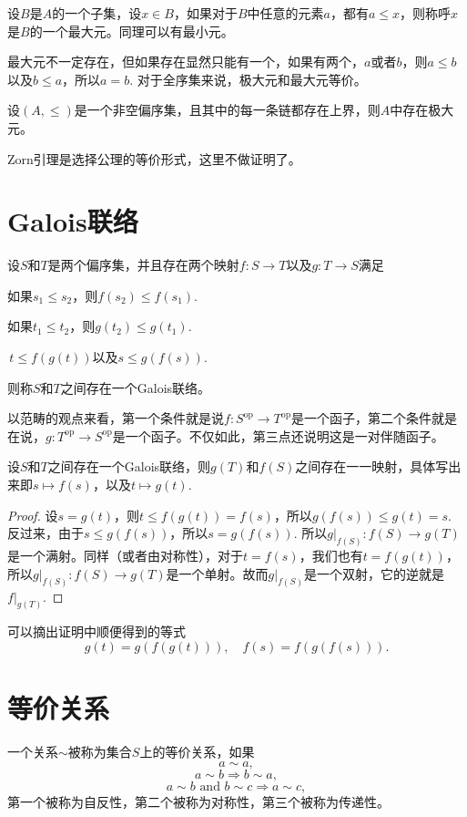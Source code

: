 \para 设$B$是$A$的一个子集，设$x\in B$，如果对于$B$中任意的元素$a$，都有$a\leq x$，则称呼$x$是$B$的一个最大元。同理可以有最小元。

最大元不一定存在，但如果存在显然只能有一个，如果有两个，$a$或者$b$，则$a\leq b$以及$b\leq a$，所以$a=b$. 对于全序集来说，极大元和最大元等价。

\begin{thm}[Zorn引理]
设$(A,\leq)$是一个非空偏序集，且其中的每一条链都存在上界，则$A$中存在极大元。
\end{thm}

Zorn引理是选择公理的等价形式，这里不做证明了。

\section{Galois联络}

\begin{para}
设$S$和$T$是两个偏序集，并且存在两个映射$f:S\to T$以及$g:T\to S$满足
\begin{compactenum}[~~~~(1)]
\item 如果$s_1\leq s_2$，则$f(s_2)\leq f(s_1)$.
\item 如果$t_1\leq t_2$，则$g(t_2)\leq g(t_1)$.
\item $\,$$t\leq f(g(t))$以及$s\leq g(f(s))$.
\end{compactenum}
则称$S$和$T$之间存在一个Galois联络。
\end{para}

以范畴的观点来看，第一个条件就是说$f:S^{\text{op}}\to T^{\text{op}}$是一个函子，第二个条件就是在说，$g:T^{\text{op}}\to S^{\text{op}}$是一个函子。不仅如此，第三点还说明这是一对伴随函子。

\begin{pro}
设$S$和$T$之间存在一个Galois联络，则$g(T)$和$f(S)$之间存在一一映射，具体写出来即$s\mapsto f(s)$，以及$t \mapsto g(t)$.
\end{pro}

\begin{proof} 
	设$s=g(t)$，则$t\leq f(g(t))=f(s)$，所以$g(f(s))\leq g(t)=s$. 反过来，由于$s\leq g(f(s))$，所以$s=g(f(s))$. 所以$g|_{f(S)}:f(S)\to g(T)$是一个满射。同样（或者由对称性），对于$t=f(s)$，我们也有$t=f(g(t))$，所以$g|_{f(S)}:f(S)\to g(T)$是一个单射。故而$g|_{f(S)}$是一个双射，它的逆就是$f|_{g(T)}$.
\end{proof}

可以摘出证明中顺便得到的等式
\[
	g(t)=g(f(g(t))),\quad f(s)=f(g(f(s))).
\]


\section{等价关系}
\para 一个关系$\sim$被称为集合$S$上的等价关系，如果
\[
	a\sim a,
\]
\[
	a\sim b \Rightarrow b \sim a,
\]
\[
	a\sim b\text{ and } b\sim c \Rightarrow a \sim c,
\]
第一个被称为自反性，第二个被称为对称性，第三个被称为传递性。

